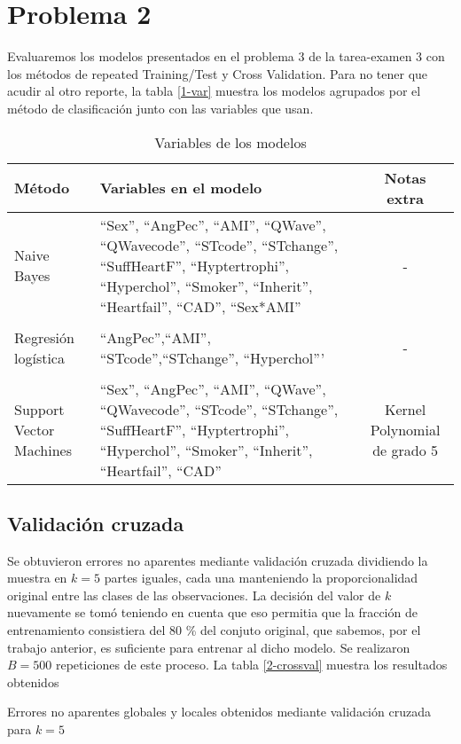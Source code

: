 \documentclass[11pt]{article}
\begin{document}
\section{Problema 2}
Evaluaremos los modelos presentados en el problema 3 de la tarea-examen 3 con los métodos de repeated Training/Test y Cross Validation. Para no tener que acudir al otro reporte, la tabla \ref{1-var} muestra los modelos agrupados por el método de clasificación junto con las variables que usan.
\begin{table}[H]
    \centering
    \begin{tabular}{p{3cm}|p{7cm} | c}
        Método & Variables en el modelo & Notas extra\\
        \hline
        Naive Bayes & ``Sex'', ``AngPec'', ``AMI'', ``QWave'', ``QWavecode'', ``STcode'', ``STchange'', ``SuffHeartF'', ``Hyptertrophi'', ``Hyperchol'', ``Smoker'', ``Inherit'', ``Heartfail'', ``CAD'', ``Sex*AMI'' & -\\
        & & \\
        Regresión logística & ``AngPec'',``AMI'', ``STcode'',``STchange'', ``Hyperchol''' & - \\
        & & \\
        Support Vector Machines & ``Sex'', ``AngPec'', ``AMI'', ``QWave'', ``QWavecode'', ``STcode'', ``STchange'', ``SuffHeartF'', ``Hyptertrophi'', ``Hyperchol'', ``Smoker'', ``Inherit'', ``Heartfail'', ``CAD'' & Kernel Polynomial de grado 5 \\
    \end{tabular}
    \caption{Variables de los modelos}
    \label{2-var}
\end{table}
\subsection{Validación cruzada}
Se obtuvieron errores no aparentes mediante validación cruzada dividiendo la muestra en $k=5$ partes iguales, cada una manteniendo la proporcionalidad original entre las clases de las observaciones. La decisión del valor de $k$ nuevamente se tomó teniendo en cuenta que eso permitia que la fracción de entrenamiento consistiera del 80 \% del conjuto original, que sabemos, por el trabajo anterior, es suficiente para entrenar al dicho modelo. Se realizaron $B=500$ repeticiones de este proceso. La tabla \ref{2-crossval} muestra los resultados obtenidos
\begin{table}[H]
    \centering
    
    \caption{Errores no aparentes globales y locales obtenidos mediante validación cruzada para $k=5$}
    \label{2-crossval}
\end{table}
\end{document}
